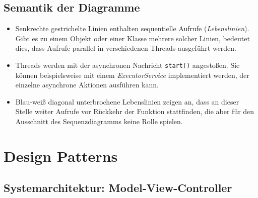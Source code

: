 \documentclass[10pt]{scrreprt}
\begin{document}
\section*{Semantik der Diagramme}
\begin{itemize}
\item Senkrechte gestrichelte Linien enthalten sequentielle Aufrufe (\textit{Lebenslinien}). Gibt es zu einem Objekt oder einer Klasse mehrere solcher Linien, bedeutet dies, dass Aufrufe parallel in verschiedenen Threads ausgeführt werden.
\item Threads werden mit der asynchronen Nachricht \texttt{start()} angestoßen. Sie können beispielsweise mit einem \textit{ExecutorService} implementiert werden, der einzelne asynchrone Aktionen ausführen kann.
\item Blau-weiß diagonal unterbrochene Lebenslinien zeigen an, dass an dieser Stelle weiter Aufrufe vor Rückkehr der Funktion stattfinden, die aber für den Ausschnitt des Sequenzdiagramms keine Rolle spielen.
\end{itemize}


\chapter{Design Patterns}

\section{Systemarchitektur: Model-View-Controller}
\end{document}
